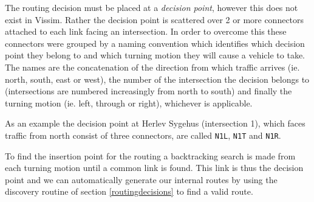 The routing decision must be placed at a \textit{decision point}, however this does not exist in Vissim. Rather the decision point is scattered over 2 or more connectors attached to each link facing an intersection. In order to overcome this these connectors were grouped by a naming convention which identifies which decision point they belong to and which turning motion they will cause a vehicle to take. 
The names are the concatenation of the direction from which traffic arrives (ie. north, south, east or west), the number of the intersection the decision belongs to (intersections are numbered increasingly from north to south) and finally the turning motion (ie. left, through or right), whichever is applicable. 

As an example the decision point at Herlev Sygehus (intersection 1), which faces traffic from north consist of three connectors, are called \verb|N1L|, \verb|N1T| and \verb|N1R|.

To find the insertion point for the routing a backtracking search is made from each turning motion until a common link is found. This link is thus the decision point and we can automatically generate our internal routes by using the discovery routine of section \ref{routingdecisions} to find a valid route.

